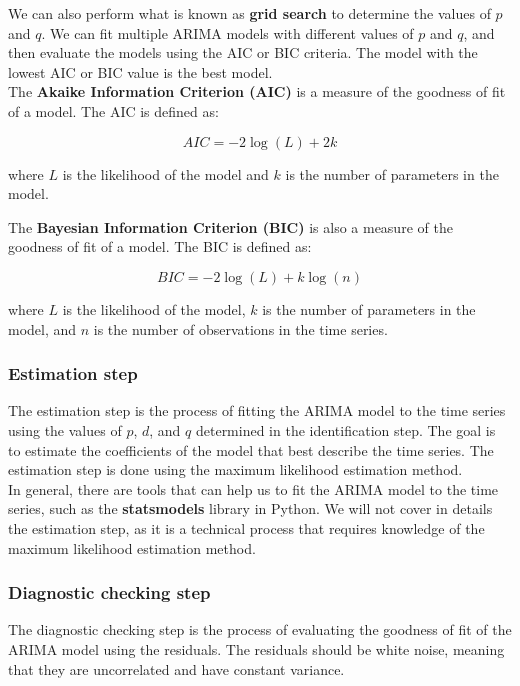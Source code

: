 We can also perform what is known as \textbf{grid search} to determine the values of
$p$ and $q$. We can fit multiple ARIMA models with different values of $p$ and $q$,
and then evaluate the models using the AIC or BIC criteria. The model with the lowest
AIC or BIC value is the best model.\\

The \textbf{Akaike Information Criterion (AIC)} is a measure of the goodness of fit of
a model. The AIC is defined as:

$$AIC = -2 \log(L) + 2k$$

where $L$ is the likelihood of the model and $k$ is the number of parameters in the model.

The \textbf{Bayesian Information Criterion (BIC)} is also a measure of the goodness of fit of
a model. The BIC is defined as:

$$BIC = -2 \log(L) + k \log(n)$$

where $L$ is the likelihood of the model, $k$ is the number of parameters in the model,
and $n$ is the number of observations in the time series.

\subsubsection{Estimation step}

The estimation step is the process of fitting the ARIMA model to the time series using
the values of $p$, $d$, and $q$ determined in the identification step. The goal is to
estimate the coefficients of the model that best describe the time series. The estimation
step is done using the maximum likelihood estimation method.\\

In general, there are tools that can help us to fit the ARIMA model to the time series,
such as the \textbf{statsmodels} library in Python. We will not cover in details the
estimation step, as it is a technical process that requires knowledge of the maximum
likelihood estimation method.

\subsubsection{Diagnostic checking step}

The diagnostic checking step is the process of evaluating the goodness of fit of the
ARIMA model using the residuals. The residuals should be white noise, meaning that they
are uncorrelated and have constant variance.\\

